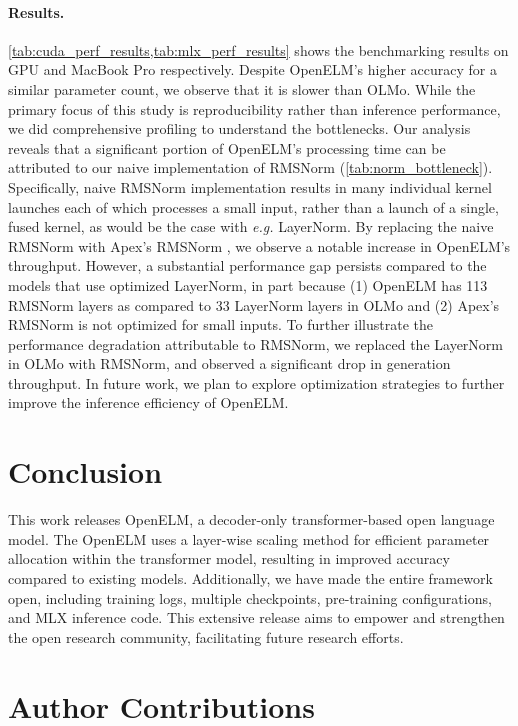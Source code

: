 \documentclass[10pt,twocolumn,letterpaper]{article}
\makeatletter
\newcommand{\model}{OpenELM\@\xspace}
\makeatother
\begin{document}
\paragraph{Results.} \cref{tab:cuda_perf_results,tab:mlx_perf_results} shows the benchmarking results on GPU and MacBook Pro respectively. Despite \model's higher accuracy for a similar parameter count, we observe that it is slower than OLMo. While the primary focus of this study is reproducibility rather than inference performance, we did comprehensive profiling to understand the bottlenecks. Our analysis reveals that a significant portion of \model's processing time can be attributed to our naive implementation of RMSNorm (\cref{tab:norm_bottleneck}). Specifically, naive RMSNorm implementation results in many individual kernel launches each of which processes a small input, rather than a launch of a single, fused kernel, as would be the case with \textit{e.g.} LayerNorm. By replacing the naive RMSNorm with Apex's RMSNorm  \cite{nvidia_apex}, we observe a notable increase in \model's throughput.  However, a substantial performance gap persists compared to the models that use optimized LayerNorm, in part because (1) \model has 113 RMSNorm layers as compared to 33 LayerNorm layers in OLMo and (2) Apex's RMSNorm is not optimized for small inputs. To further illustrate the performance degradation attributable to RMSNorm, we replaced the LayerNorm in OLMo with RMSNorm, and observed a significant drop in generation throughput. In future work, we plan to explore optimization strategies to further improve the inference efficiency of \model.

\section{Conclusion}
This work releases \model, a decoder-only transformer-based open language model. The \model uses a layer-wise scaling method for efficient parameter allocation within the transformer model, resulting in improved accuracy compared to existing models. Additionally, we have made the entire framework open, including training logs, multiple checkpoints, pre-training configurations, and MLX inference code. This extensive release aims to empower and strengthen the open research community, facilitating future research efforts.

\section*{Author Contributions}
\end{document}

